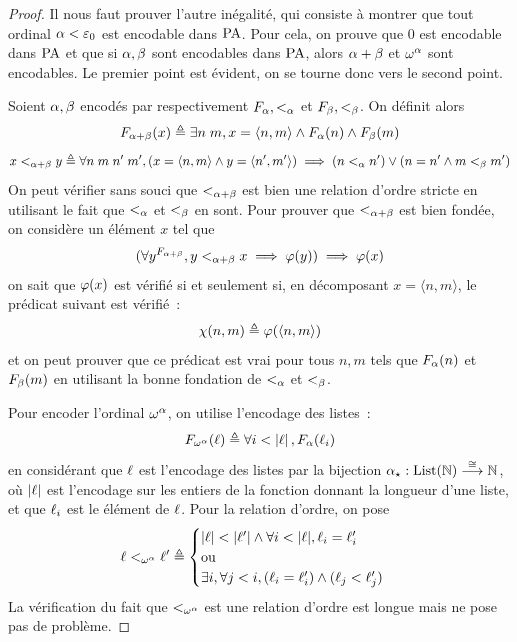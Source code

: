\begin{proof}
  Il nous faut prouver l'autre inégalité, qui consiste à montrer que tout
  ordinal $\alpha < \varepsilon_{0}$ est encodable dans $\operatorname{PA}$. Pour cela,
  on prouve que $0$ est encodable dans $\operatorname{PA}$ et que si
  $\alpha,\beta$ sont encodables dans $\operatorname{PA}$, alors
  $\alpha + \beta$ et $\omega^\alpha$ sont encodables. Le premier point est
  évident, on se tourne donc vers le second point.

  Soient $\alpha,\beta$ encodés par respectivement $F_\alpha,<_\alpha$ et
  $F_\beta,<_\beta$. On définit alors
  \[F_{\alpha+\beta}(x) \triangleq \exists n\;m, x = \langle n,m\rangle \land
  F_\alpha(n) \land F_\beta(m)\]
  \[x<_{\alpha+\beta}y \triangleq \forall n\;m\;n'\;m', (x = \langle n,m\rangle \land
  y = \langle n',m'\rangle)\implies (n <_{\alpha} n')\lor (n = n'\land
  m <_{\beta} m')\]
  On peut vérifier sans souci que $<_{\alpha+\beta}$ est bien une relation d'ordre
  stricte en utilisant le fait que $<_\alpha$ et $<_\beta$ en sont.
  Pour prouver que $<_{\alpha+\beta}$ est bien fondée, on considère un élément
  $x$ tel que
  \[(\forall y^{F_{\alpha+\beta}}, y <_{\alpha+\beta} x \implies
  \varphi(y))\implies \varphi(x)\]
  on sait que $\varphi(x)$ est vérifié si et seulement si, en décomposant
  $x = \langle n,m\rangle$, le prédicat suivant est vérifié~:
  \[\chi(n,m) \triangleq \varphi(\langle n,m\rangle)\]
  et on peut prouver que ce prédicat est vrai pour tous $n,m$ tels que
  $F_\alpha(n)$ et $F_\beta(m)$ en utilisant la bonne fondation de $<_\alpha$ et
  $<_\beta$.

  Pour encoder l'ordinal $\omega^\alpha$, on utilise l'encodage des listes~:
  \[F_{\omega^\alpha}(\ell) \triangleq \forall i < \left\vert\ell\right\vert,
  F_{\alpha}(\ell_i)\]
  en considérant que $\ell$ est l'encodage des listes par la bijection
  $\alpha_{\star} : \displaystyle \operatorname{List}(\mathbb N) \overset{\cong}{\longrightarrow} \mathbb N$, où $\left\vert\ell\right\vert$ est
  l'encodage sur les entiers de la fonction donnant la longueur d'une liste, et
  que $\ell_i$ est le  élément de $\ell$. Pour
  la relation d'ordre, on pose
  \[\ell <_{\omega^\alpha} \ell' \triangleq
  \begin{cases}
    |\ell| < |\ell'| \land \forall i < |\ell|,
    \ell_i = \ell'_i\\
    \text{ou}\\
    \exists i, \forall j < i, (\ell_i = \ell'_i)\land
    (\ell_j < \ell'_j)
  \end{cases}\]
  La vérification du fait que $<_{\omega^\alpha}$ est une relation d'ordre est
  longue mais ne pose pas de problème.


\end{proof}
